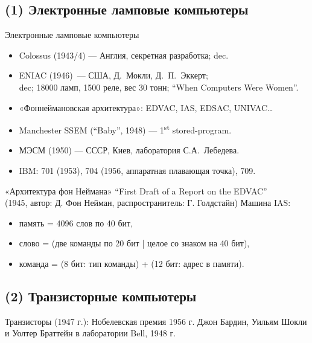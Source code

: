 \subsection {(1) Электронные ламповые компьютеры}

\begin{frame}{Электронные ламповые компьютеры}
\begin{itemize}[<+->]
    \item Colossus (1943/4) — Англия, секретная разработка; dec.
    \item ENIAC (1946)~— США, Д.~Мокли, Д.~П.~Эккерт; \\
    {\small dec; 18000 ламп, 1500 реле, вес 30 тонн; “When Computers Were Women”.}
    \item «Фоннеймановская архитектура»: {\small EDVAC, IAS, EDSAC, UNIVAC…}
    \item Manchester SSEM (“Baby”, 1948) — 1\textsuperscript{st} stored-program.
    \item МЭСМ (1950) — СССР, Киев, лаборатория С.А.~Лебедева.
    \item IBM: 701 (1953), 704 (1956, аппаратная плавающая точка), 709.
\end{itemize}
\end{frame}

\begin{frame}{«Архитектура фон Неймана»}
“First Draft of a Report on the EDVAC”\\
{\small (1945, автор: Д. Фон Нейман, распространитель: Г. Голдстайн)}
\pause Машина IAS:
\begin{itemize}
    \item память = 4096 слов по 40 бит,
    \item слово = (две команды по 20 бит | целое со знаком на 40 бит),
    \item команда = (8 бит: тип команды) + (12 бит: адрес в памяти).
\end{itemize}
\end{frame}

\subsection {(2) Транзисторные компьютеры}

\begin{frame}{Транзисторы (1947 г.): Нобелевская премия 1956 г.}
\vspace{-.3cm}\small Джон Бардин, Уильям Шокли и Уолтер Браттейн в лаборатории Bell, 1948 г.
\end{frame}

